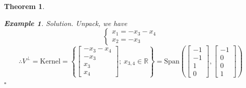 \documentclass[12pt, a4paper]{article}
\newtheorem{thm}{Theorem}[subsection]
\newtheorem{eg}{Example}[subsection]
\newenvironment*{sol}{\indent\textit{Solution. }}{\hfill{$\square$}\par}
\def\R{{\mathbb{R}}}
\def\Span{\mathrm{Span}}
\begin{document}
\begin{thm}
\begin{eg}
\begin{sol}
		Unpack, we have \[\begin{cases}x_1=-x_3-x_4\\x_2=-x_3\end{cases}\]
		\[\therefore V^\perp=\text{Kernel}=\left\{\begin{bmatrix}-x_3-x_4\\-x_3\\x_3\\x_4\end{bmatrix};\ x_{3,4}\in\R\right\}=\Span\left(\begin{bmatrix}-1\\-1\\1\\0\end{bmatrix},\begin{bmatrix}-1\\0\\0\\1\end{bmatrix}\right)\]
	\end{sol}
	\end{eg}
\end{thm}
\end{document}
